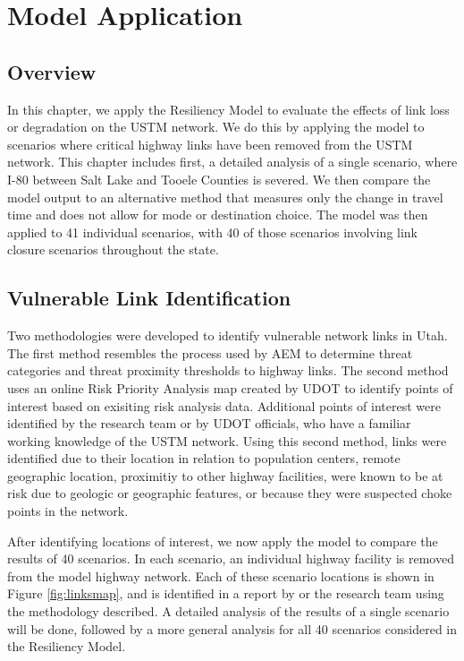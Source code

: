 \chapter{Model Application}
\label{chp:chapter4}
\graphicspath{{figures/}{figures/chapter4/}}

\section{Overview}
In this chapter, we apply the Resiliency Model to evaluate the effects of link
loss or degradation on the USTM network. We do this by applying the model to scenarios
where critical highway links have been removed from the USTM network. This
chapter includes first, a detailed analysis of a single scenario, where I-80
between Salt Lake and Tooele Counties is severed. We then compare the model
output to an alternative method that measures only the change in travel
time and does not allow for mode or destination choice. The model was then
applied to 41 individual scenarios, with 40 of those scenarios involving link
closure scenarios throughout the state.

\section{Vulnerable Link Identification}
Two methodologies were developed to identify vulnerable network links in
Utah. The first method resembles the process used by AEM to determine
threat categories and threat proximity thresholds to highway links. The
second method uses an online Risk Priority Analysis map created by UDOT to identify points of interest based on exisiting risk analysis data. Additional
points of interest were identified by the research team or by UDOT officials, who have a familiar working knowledge of the USTM network. Using this second
method, links were identified due to their location in relation to
population centers, remote geographic location, proximitiy to other highway facilities, were known to be at risk due to geologic or geographic features, or
because they were suspected choke points in the network.

After identifying locations of interest, we now apply the model to compare the results of 40 scenarios. In each scenario, an individual highway
facility is removed from the model highway network. Each of these scenario locations is shown in Figure \ref{fig:linksmap}, and is identified in a report by
\cite{aem2017} or the research team using the methodology described. A detailed analysis of the results of a single scenario will be done, followed by a
more general analysis for all 40 scenarios considered in the Resiliency Model.

